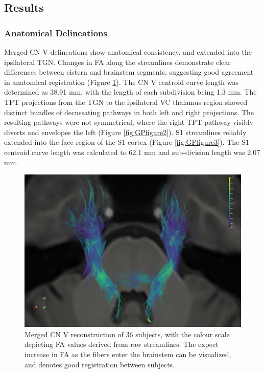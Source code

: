 \subsection{Results}
\subsubsection{Anatomical Delineations}
Merged CN V delineations show anatomical consistency, and extended into the ipsilateral TGN. Changes in FA along the streamlines demonstrate clear differences between cistern and brainstem segments, suggesting good agreement in anatomical registration (Figure \ref{fig:GPfigure1}). The CN V centroid curve length was determined as 38.91 mm, with the length of each subdivision being 1.3 mm.
The TPT projections from the TGN to the ipsilateral VC thalamus region showed distinct bundles of decussating pathways in both left and right projections. The resulting pathways were not symmetrical, where the right TPT pathway visibly diverts and envelopes the left (Figure \ref{fig:GPfigure2}).
S1 streamlines reliably extended into the face region of the S1 cortex (Figure \ref{fig:GPfigure3}). The S1 centroid curve length was calculated to 62.1 mm and sub-division length was 2.07 mm.

\begin{figure}[ht]
\centering
\includegraphics[width=\linewidth]{cnv-inferior-view.png}
\caption{Merged CN V reconstruction of 36 subjects, with the colour scale depicting FA values derived from raw streamlines. The expect increase in FA as the fibers enter the brainstem can be visualized, and denotes good registration between subjects. }
\label{fig:GPfigure1}
\end{figure}

